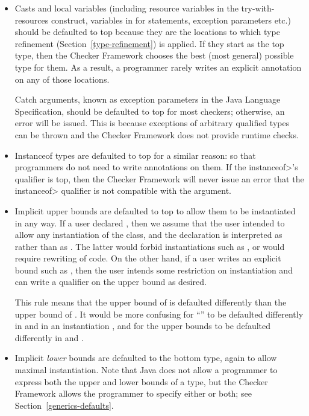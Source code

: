 \begin{itemize}
\item
Casts and local variables (including resource variables in the
try-with-resources construct, variables in for statements, exception parameters etc.)
should be defaulted to top because they are the locations to
which type refinement (Section~\ref{type-refinement}) is applied.  If they
start as the top type, then the Checker Framework chooses the best (most
general) possible type for them.  As a result, a programmer rarely writes
an explicit annotation on any of those locations.

Catch arguments, known as exception parameters in the Java Language Specification,
should be defaulted to top for most checkers; otherwise, an error will be issued.  This is because
exceptions of arbitrary qualified types can be thrown and the Checker Framework
does not provide runtime checks.


\item
Instanceof types are defaulted to top for a similar reason:  so that
programmers do not need to write annotations on them.  If the
\<instanceof>'s qualifier is top, then the Checker Framework will never
issue an error that the \<instanceof> qualifier is not compatible with the
argument.

\item
Implicit upper bounds are defaulted to top to allow them to be instantiated
in any way.  If a user declared , then
we assume that the user intended to allow any instantiation of the class,
and the declaration is interpreted as  rather than as .  The latter would forbid
instantiations such as , or would require
rewriting of code.  On the other hand, if a user writes an explicit bound
such as , then the user
intends some restriction on instantiation and can write a qualifier on the
upper bound as desired.

This rule means that the upper bound of  is defaulted
differently than the upper bound of .  It
would be more confusing for ``'' to be defaulted differently in  and in an
instantiation , and for the upper bounds to be defaulted
differently in 
and .

\item
Implicit \emph{lower} bounds are defaulted to the bottom type, again to allow
maximal instantiation.  Note that Java does not allow a programmer to
express both the upper and lower bounds of a type, but the Checker
Framework allows the programmer to specify either or both;
see Section~\ref{generics-defaults}.

\end{itemize}

